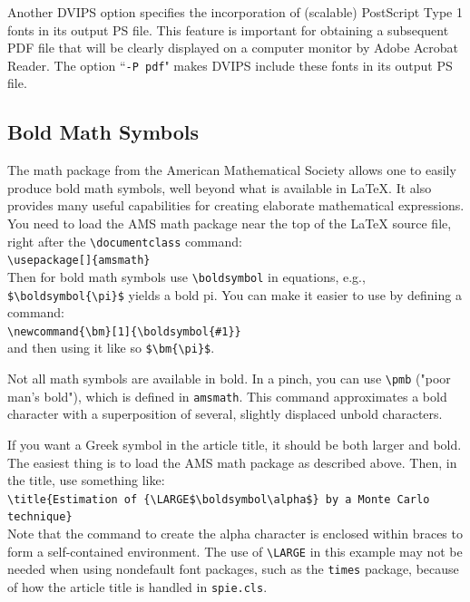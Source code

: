 \documentclass[]{spie}  %
\begin{document}
Another DVIPS option specifies the incorporation of (scalable) PostScript Type 1 fonts in its output PS file. This feature is important for obtaining a subsequent PDF file that will be clearly displayed on a computer monitor by Adobe Acrobat Reader.  The option ``{\tt -P pdf}" makes DVIPS include these fonts in its output PS file.

\subsection{Bold Math Symbols} 

The math package from the American Mathematical Society allows one to easily produce bold math symbols, well beyond what is available in LaTeX. It also provides many useful capabilities for creating elaborate mathematical expressions. You need to load the AMS math package near the top of the LaTeX source file, right after the \verb+\documentclass+ command:\\[1ex]
\verb+\usepackage[]{amsmath}+ \\[1ex]
Then for bold math symbols use \verb+\boldsymbol+ in equations, e.g., 
\verb+$\boldsymbol{\pi}$+ 
yields a bold pi.  You can make it easier to use by defining a command:\\[1ex]
\verb+\newcommand{\bm}[1]{\boldsymbol{#1}}+ \\[1ex]
and then using it like so \verb+$\bm{\pi}$+.

Not all math symbols are available in bold.  In a pinch, you can use \verb+\pmb+ ("poor man's bold"), which is defined in \verb+amsmath+. This command approximates a bold character with a superposition of several, slightly displaced unbold characters.

If you want a Greek symbol in the article title, it should be both larger and bold. The easiest thing is to load the AMS math package as described above. 
Then, in the title, use something like:\\[1ex]
\verb+\title{Estimation of {\LARGE$\boldsymbol\alpha$} by a Monte Carlo technique}+ \\[1ex]
Note that the command to create the alpha character is enclosed within braces to form a self-contained environment. The use of \verb+\LARGE+ in this example may not be needed when using nondefault font packages, such as the {\tt times} package, because of how the article title is handled in {\tt spie.cls}.

\end{document}
